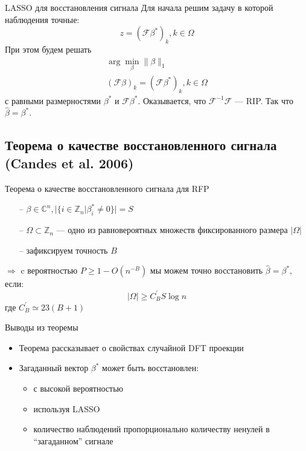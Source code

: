 \documentclass[14pt, fleqn, xcolor={dvipsnames, table}]{beamer}
\begin{document}
\begin{frame}{LASSO для восстановления сигнала}
Для начала решим задачу в которой наблюдения точные:
$$
z = (\mathcal{F}\beta^*)_k, k \in \Omega
$$
При этом будем решать 
$$\begin{array}{l}
\arg \min_\beta \|\beta\|_1 \\
(\mathcal{F}\beta)_k = (\mathcal{F}\beta^*)_k, k \in \Omega
\end{array}$$
с равными размерностями $\beta^*$ и $\mathcal{F}\beta^*$. Оказывается, что $\mathcal{F}^{-1} \mathcal{F}$ --- RIP. Так что $\hat{\beta} = \beta^*$.
\end{frame}

\subsection{Теорема о качестве восстановленного сигнала (Candes et al. 2006)}
\begin{frame}{Теорема о качестве восстановленного сигнала для RFP}
\small
\begin{theorem}[Candes et al. (2006)]
\begin{itemize}
\item[--] $\beta\in\mathbb{C}^n, |\{i \in \mathbb{Z}_n|\beta^*_i \ne 0\}| = S$ 
\item[--] $\Omega \subset \mathbb{Z}_n$ --- одно из равновероятных множеств фиксированного размера $|\Omega|$
\item[--] зафиксируем точность $B$
\end{itemize}
\vspace{-1em}
$\Rightarrow$ c вероятностью $P \ge 1 - O(n^{-B})$ мы можем точно восстановить $\hat{\beta} = \beta^*$, если:
$$
|\Omega| \ge C^{'}_B S \log n
$$
где $C^{'}_B \simeq 23(B + 1)$
\end{theorem}
\end{frame}

\begin{frame}{Выводы из теоремы}
\begin{itemize}
  \item Теорема рассказывает о свойствах случайной DFT проекции
  \item Загаданный вектор $\beta^*$ может быть восстановлен:
  \begin{itemize}
    \item с высокой вероятностью
    \item используя LASSO
    \item количество наблюдений пропорционально количеству ненулей в ``загаданном'' сигнале
  \end{itemize}
\end{itemize}
\end{frame}
\end{document}
